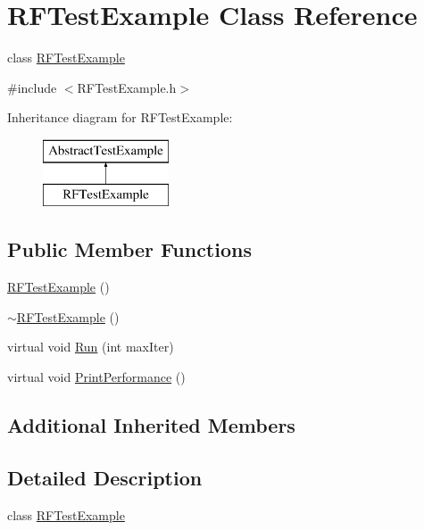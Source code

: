 \hypertarget{class_r_f_test_example}{}\section{R\+F\+Test\+Example Class Reference}
\label{class_r_f_test_example}


class \hyperlink{class_r_f_test_example}{R\+F\+Test\+Example}  




{\ttfamily \#include $<$R\+F\+Test\+Example.\+h$>$}

Inheritance diagram for R\+F\+Test\+Example\+:\begin{figure}[H]
\begin{center}
\leavevmode
\includegraphics[height=2.000000cm]{class_r_f_test_example}
\end{center}
\end{figure}
\subsection*{Public Member Functions}
\begin{DoxyCompactItemize}
\item 
\hyperlink{class_r_f_test_example_a322a2a8b8f166fdec1c6d861c747f0dc}{R\+F\+Test\+Example} ()
\item 
\hyperlink{class_r_f_test_example_a13d41ad2a8acaaee0d19df83b813615a}{$\sim$\+R\+F\+Test\+Example} ()
\item 
virtual void \hyperlink{class_r_f_test_example_a9b935f69b49525d77dbadfa9869df17b}{Run} (int max\+Iter)
\item 
virtual void \hyperlink{class_r_f_test_example_a652c91791e5ba6ce6b89029ba0d9ac8e}{Print\+Performance} ()
\end{DoxyCompactItemize}
\subsection*{Additional Inherited Members}


\subsection{Detailed Description}
class \hyperlink{class_r_f_test_example}{R\+F\+Test\+Example} 

